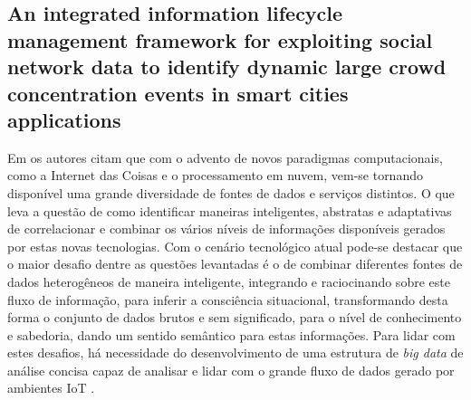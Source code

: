 \documentclass[ti,table]{texufpel} %
\begin{document}
     

  

  

\subsection{An integrated information lifecycle management framework for exploiting social network data to identify dynamic large crowd concentration events in smart cities applications} 

  

    Em \cite{art9kousiouris2018integrated} os autores citam que com o advento de novos paradigmas computacionais, como a Internet das Coisas e o processamento em nuvem, vem-se tornando disponível uma grande diversidade de fontes de dados e serviços distintos. O que leva a questão de como identificar maneiras inteligentes, abstratas e adaptativas de correlacionar e combinar os vários níveis de informações disponíveis gerados por estas novas tecnologias. Com o cenário tecnológico atual pode-se destacar que o maior desafio dentre as questões levantadas é o de combinar diferentes fontes de dados heterogêneos de maneira inteligente, integrando e raciocinando sobre este fluxo de informação, para inferir a consciência situacional, transformando desta forma o conjunto de dados brutos e sem significado, para o nível de conhecimento e sabedoria, dando um sentido semântico para estas informações. Para lidar com estes desafios, há necessidade do desenvolvimento de uma estrutura de \textit{big data} de análise concisa capaz de analisar e lidar com o grande fluxo de dados gerado por ambientes IoT .     

     
\end{document}
